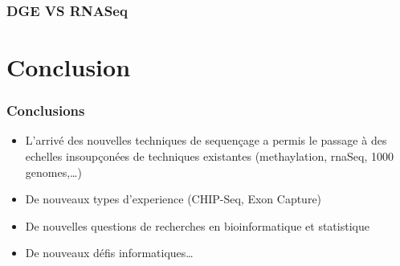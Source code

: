 \documentclass{beamer}
\begin{document}
\begin{frame}
	\frametitle{DGE VS RNASeq}
\end{frame}


\section{Conclusion} %
\label{sec:conclusion}

\begin{frame}
	\frametitle{Conclusions}
	\begin{itemize}
		\item L'arrivé des nouvelles techniques de sequençage a permis le passage à des echelles insoupçonées de techniques existantes (methaylation, rnaSeq, 1000 genomes,\ldots)
		\item De nouveaux types d'experience (CHIP-Seq, Exon Capture) 
		\item De nouvelles questions de recherches en bioinformatique et statistique
		\item De nouveaux défis informatiques\ldots
	\end{itemize}
\end{frame}
\end{document}
